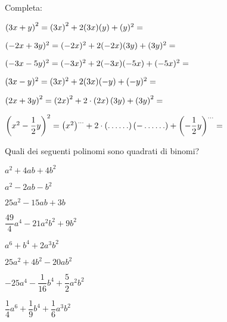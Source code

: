 
\subsubsection*{}

\begin{esercizio}
 \label{ese:11.1}
Completa:

\begin{enumeratea}
\item $ \left( 3x + y\right)^{2} = \left(3x\right)^{2} + 2(3x)(y) + (y) ^{2} = 
\dotfill~$
\item $ (-2x + 3y)^{2} = (-2x)^{2} + 2(-2x)(3y) +(3y)^{2} = \dotfill~$
\item $(-3x -5y)^{2} = (-3x)^{2} + 2(-3x)(-5x)+(-5x)^{2}= \dotfill~$
\item $(3x - y)^{2} = (3x)^{2} +2(3x)(-y) + (-y)^{2} = \dotfill~$
\item 
$\left(2x+3y\right)^{2}=\left(2x\right)^{2}
+2\cdot\left(2x\right)\left(3y\right)+\left(3y\right)^{2}=\dotfill$
\item $\left(x^{2}-\dfrac{1}{2}y\right)^{2}=\left(x^{2}\right)^{\ldots}+2\cdot%
\left(\ldots \ldots \right)\left(-\ldots \ldots%
\right)+\left(-{\dfrac{1}{2}}y\right)^{\ldots }=\dotfill~$
\end{enumeratea}
\end{esercizio}


\begin{esercizio}
 \label{ese:11.2}
Quali dei seguenti polinomi sono quadrati di binomi?

\begin{multicols}{2}
\TabPositions{4cm}
\begin{enumeratea}
\spazielenx
\item $a^{2}+4{ab}+4b^{2}$ \tab\boxSi\quad\boxNo
\item $a^{2}-2{ab}-b^{2}$ \tab\boxSi\quad\boxNo
\item $25a^{2}-15{ab}+3b$ \tab\boxSi\quad\boxNo
\item $\dfrac{49}{4}a^{4}-21a^{2}b^{2}+9b^{2}$ \tab\boxSi\quad\boxNo
\item $a^{6}+b^{4}+2a^{3}b^{2}$ \tab\boxSi\quad\boxNo
\item $25a^{2}+4b^{2}-20{ab}^{2}$ \tab\boxSi\quad\boxNo
\item $-25a^{4}-\dfrac{1}{16}b^{4}+\dfrac{5}{2}a^{2}b^{2}$ \tab\boxSi\quad\boxNo
\item $\dfrac{1}{4}a^{6}+\dfrac{1}{9}b^{4}+\dfrac{1}{6}a^{3}b^{2}$ 
\tab\boxSi\quad\boxNo
\end{enumeratea}
\end{multicols}
\end{esercizio}

